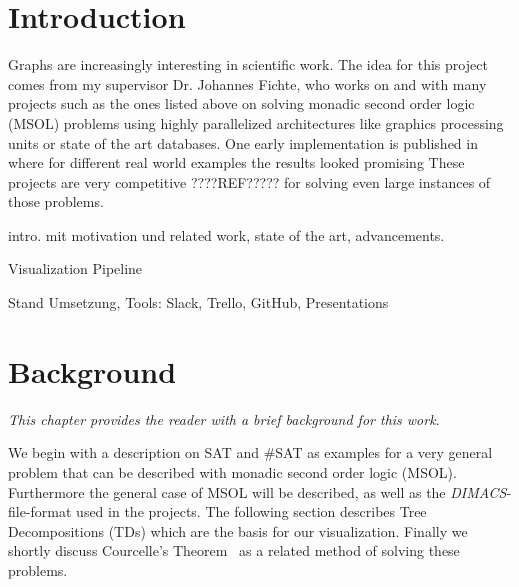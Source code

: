\documentclass[a4paper, 12pt]{scrartcl}
\begin{document}
\newpage

\tableofcontents

\newpage


\section{Introduction}
Graphs are increasingly interesting in scientific work.
The idea for this project comes from my supervisor Dr. Johannes Fichte, who works on and with many projects such as the ones listed above on solving monadic second order logic (MSOL\cite{Courcelle2012}) problems using highly parallelized architectures like graphics processing units or state of the art databases.
One early implementation is published in \cite{evaluationMSO} where for different real world examples the results looked promising
These projects are very competitive ????REF????? for solving even large instances of those problems.

intro. mit motivation und related work, state of the art, advancements.


Visualization Pipeline

Stand Umsetzung, Tools: Slack, Trello, GitHub, Presentations


\newpage
\section{Background}
\textit{This chapter provides the reader with a brief background for this work}.

We begin with a description on SAT and #SAT as examples for a very general problem that can be described with monadic second order logic (MSOL).
Furthermore the general case of MSOL will be described, as well as the \textit{DIMACS}-file-format used in the projects.
The following section describes Tree Decompositions (TDs) which are the basis for our visualization. 
Finally we shortly discuss Courcelle's Theorem~\cite{Courcelle2012} as a related method of solving these problems.
\end{document}
